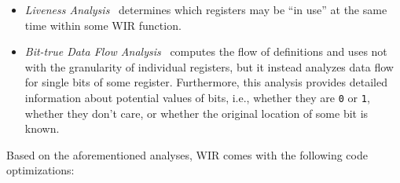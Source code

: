 \begin{itemize}
  \item \textit{Liveness Analysis}~\cite[chapter~10]{Appel04} determines which registers may be ``in use'' at the same time within some \gls{WIR} function.

  \item \textit{Bit-true Data Flow Analysis}~\cite{Wag06} computes the flow of definitions and uses not with the granularity of individual registers, but it instead analyzes data flow for single bits of some register.
  Furthermore, this analysis provides detailed information about potential values of bits, i.e., whether they are \texttt{0} or \texttt{1}, whether they don't care, or whether the original location of some bit is known.
\end{itemize}

Based on the aforementioned analyses, \gls{WIR} comes with the following code optimizations:

